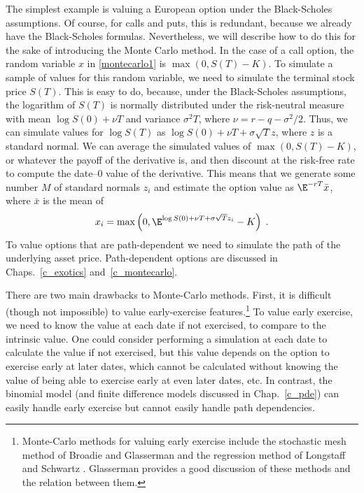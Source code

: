 The simplest example is valuing a European option under the Black-Scholes assumptions.  Of course, for calls and puts, this is redundant, because we already have the Black-Scholes formulas.  Nevertheless, we will describe how to do this for the sake of introducing the Monte Carlo method.  In the case of a call option, the random variable $x$ in \eqref{montecarlo1} is $\max(0,S(T)-K)$.  To simulate a sample of values for this random variable, we need to simulate the terminal stock price $S(T)$.  This is easy to do, because, under the Black-Scholes assumptions, the logarithm of $S(T)$ is normally distributed under the risk-neutral measure with mean $\log S(0)+\nu T$ and variance $\sigma^2T$, where $\nu=r-q-\sigma^2/2$.  Thus, we can simulate values for $\log S(T)$ as $\log S(0)+\nu T + \sigma\sqrt{T}z$, where $z$ is a standard normal.  We can  average the simulated values of $\max(0,S(T)-K)$, or whatever the payoff of the derivative is, and then discount at the risk-free rate to compute the date--0 value of the derivative.  This means that we generate some number $M$ of standard normals $z_i$ and estimate the option value as $\E^{-rT}\bar{x}$, where $\bar{x}$ is the mean of 
$$x_i = \max\left(0,\E^{\log S(0)+\nu T + \sigma\sqrt{T}z_i}-K\right)\; .$$
To value options that are path-dependent  we need to simulate the path of the underlying asset price.  Path-dependent options are discussed in Chaps.~\ref{c_exotics} and~\ref{c_montecarlo}.

There are two main drawbacks to Monte-Carlo methods.  First, it is difficult (though not impossible) to value early-exercise features.\footnote{Monte-Carlo methods for valuing early exercise include the stochastic mesh method of Broadie and Glasserman \cite{BG} and the regression method of Longstaff and Schwartz \cite{LS01}.  Glasserman \cite{Glasserman} provides a good discussion of these methods and the relation between them.}  To value early exercise, we need to know the value at each date if not exercised, to compare to the intrinsic value.  One could consider performing a simulation at each date to calculate the value if not exercised, but this value depends on the option to exercise early at later dates, which cannot be calculated without knowing the value of being able to exercise early at even later dates, etc.  In contrast, the binomial model (and finite difference models discussed in Chap.~\ref{c_pde}) can easily handle early exercise but cannot easily handle path dependencies.  

